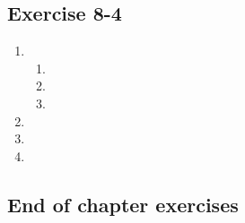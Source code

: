 \subsection{Exercise 8-4} %
\begin{enumerate}[itemsep=5pt, label=\textbf{\arabic*}. ]
\item %
  \begin{enumerate}[noitemsep, label=\textbf{(\alph*)} ]
\item %
\item %
\item %
\end{enumerate}

\item %
\item %

\item %
\end{enumerate}
\subsection{End of chapter exercises} %

